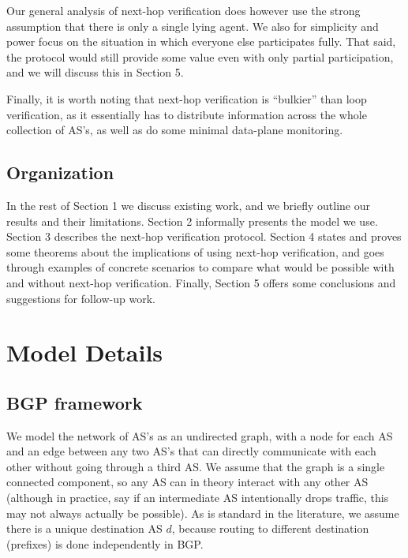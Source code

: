 \documentclass[10pt]{article}
\begin{document}
    Our general analysis of next-hop verification does however use the strong
    assumption that there is only a single lying agent.
    We also for simplicity
    and power focus on the situation in which everyone else participates fully.
    That said, the protocol would still provide some value even with only
    partial participation, and we will discuss this in Section 5. 

    Finally, it is worth noting that next-hop verification is ``bulkier'' than loop
    verification, as it essentially has to distribute information across the
    whole collection of AS's, as well as do some minimal data-plane monitoring.

  \subsection{Organization}
    In the rest of Section 1 we discuss existing work, and we briefly outline
    our results and their limitations. Section 2 informally presents the model
    we use. Section 3 describes the next-hop verification protocol. Section 4
    states and proves some theorems about the implications of using next-hop
    verification, and goes through examples of concrete scenarios to compare
    what would be possible with and without next-hop verification. Finally,
    Section 5 offers some conclusions and suggestions for follow-up work.


\section{Model Details}
  \subsection{BGP framework}
    We model the network of AS's as an undirected graph, with a node for each AS
    and an edge between any two AS's that can directly communicate with each other
    without going through a third AS. We assume that the graph is a single
    connected component, so any AS can in theory interact with any other AS
    (although in practice, say if an intermediate AS intentionally drops traffic,
    this may not always actually be possible).
    As is standard in the literature, we assume there is a unique destination AS
    $d$, because routing to different destination (prefixes) is done
    independently in BGP.
\end{document}
